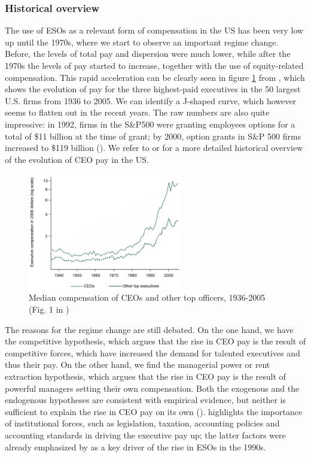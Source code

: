\subsubsection{Historical overview}
The use of ESOs as a relevant form of compensation in the US has been very low up until the 1970s, where we start to observe an important regime change. Before, the levels of total pay and dispersion were much lower, while after the 1970s the levels of pay started to increase, together with the use of equity-related compensation.
This rapid acceleration can be clearly seen in figure \ref*{fig:frydman_fig1} from \cite{frydman2010ceo}, which shows the evolution of pay for the three highest-paid executives in the 50 largest U.S. firms from 1936 to 2005. We can identify a J-shaped curve, which however seems to flatten out in the recent years. The raw numbers are also quite impressive: in 1992, firms in the S\&P500 were granting employees options for a total of \$11 billion at the time of grant; by 2000, option grants in S\&P 500 firms increased to \$119 billion (\cite{hall2003trouble}). We refer to \cite{frydman2010ceo} or \cite{edmans2017executive} for a more detailed historical overview of the evolution of CEO pay in the US. 

\vspace*{15pt}
\begin{figure}[H]
    \centering
    \includegraphics[width=0.6\textwidth]{fig/2/Frydman_fig1.png}
    \caption{Median compensation of CEOs and other top officers, 1936-2005 (Fig. 1 in \cite{frydman2010ceo})}
    \label{fig:frydman_fig1}
\end{figure}
\vspace*{15pt}


The reasons for the regime change are still debated. On the one hand, we have the competitive hypothesis, which argues that the rise in CEO pay is the result of competitive forces, which have increased the demand for talented executives and thus their pay. On the other hand, we find the managerial power or rent extraction hypothesis, which argues that the rise in CEO pay is the result of powerful managers setting their own compensation. Both the exogenous and the endogenous hypotheses are consistent with empirical evidence, but neither is sufficient to explain the rise in CEO pay on its own (\cite{frydman2010ceo}). \cite{edmans2017executive} highlights the importance of institutional forces, such as legislation, taxation, accounting policies and accounting standards in driving the executive pay up; the latter factors were already emphasized by \cite{hall2003trouble} as a key driver of the rise in ESOs in the 1990s. 


